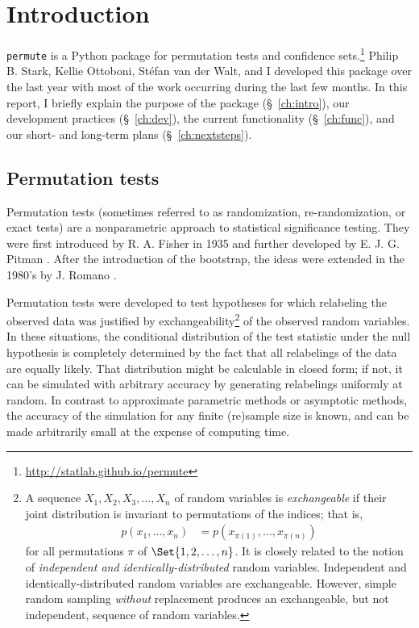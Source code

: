 \chapter{\label{ch:intro}Introduction}

\texttt{permute} is a Python package for permutation tests and confidence
sets.\footnote{\url{http://statlab.github.io/permute}} Philip B. Stark, Kellie
Ottoboni, St\'{e}fan van der Walt, and I developed this package over the last
year with most of the work occurring during the last few months.  In this
report, I briefly explain the purpose of the package (\S~\ref{ch:intro}), our
development practices (\S~\ref{ch:dev}), the current functionality
(\S~\ref{ch:func}), and our short- and long-term plans (\S~\ref{ch:nextsteps}).

\section{Permutation tests}

Permutation tests (sometimes referred to as randomization, re-randomization, or
exact tests) are a nonparametric approach to statistical significance testing.
They were first introduced by R. A. Fisher in 1935 \cite{fisher1935design} and
further developed by E. J. G. Pitman  \cite{pitman1937,
pitman1938significance}.  After the introduction of the bootstrap, the ideas
were extended in the 1980's by J. Romano \cite{romano1988bootstrap,
romano1989bootstrap}.

Permutation tests were developed to test hypotheses for which relabeling the
observed data was justified by 
exchangeability\footnote{A sequence $X_1, X_2, X_3, \dots, X_n$ of random
variables is \emph{exchangeable} if their joint distribution is invariant to
permutations of the indices; that is,
\begin{align*}
p(x_1, \dots, x_n) &= p(x_{\pi(1)}, \dots, x_{\pi(n)})
\end{align*}
for all permutations $\pi$ of $\Set{1, 2, \dots, n}$.  It is closely related to the
notion of \emph{independent and identically-distributed} random variables.
Independent and identically-distributed random variables are exchangeable.
However, simple random sampling \emph{without} replacement produces an
exchangeable, but not independent, sequence of random variables.}
of the observed random variables.  In these situations, the
conditional distribution of the test statistic under the null hypothesis is completely
determined by the fact that all relabelings of the data are equally likely.
That distribution might be calculable in closed form; if not, it can be simulated
with arbitrary accuracy by generating relabelings uniformly at random.
In contrast to approximate parametric methods or asymptotic methods, the accuracy
of the simulation for any finite (re)sample size is known, and can be made
arbitrarily small at the expense of computing time.

